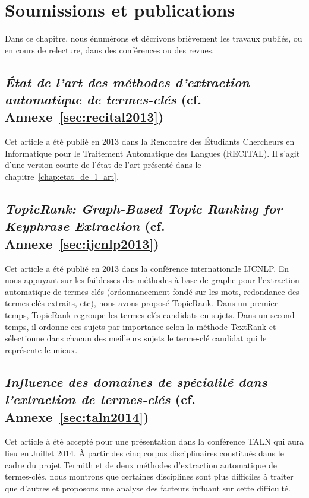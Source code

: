 \chapter{Soumissions et publications}
  Dans ce chapitre, nous énumérons et décrivons brièvement les travaux
  publiés, ou en cours de relecture, dans des conférences ou des revues.

  \section{\textit{État de l'art des méthodes d'extraction automatique de
           termes-clés} (cf. Annexe~\ref{sec:recital2013})}
    Cet article a été publié en 2013 dans la Rencontre des Étudiants Chercheurs
    en Informatique pour le Traitement Automatique des Langues (RECITAL). Il
    s'agit d'une version courte de l'état de l'art présenté dans le
    chapitre~\ref{chap:etat_de_l_art}.

  \section{\textit{TopicRank: Graph-Based Topic Ranking for Keyphrase
           Extraction} (cf. Annexe~\ref{sec:ijcnlp2013})}
  \label{sec:resume_ijcnlp2013}
    Cet article a été publié en 2013 dans la conférence internationale IJCNLP.
    En nous appuyant sur les faiblesses des méthodes à base de graphe pour
    l'extraction automatique de termes-clés (ordonnancement fondé sur les mots,
    redondance des termes-clés extraits, etc), nous avons proposé TopicRank.
    Dans un premier temps, TopicRank regroupe les termes-clés candidats en
    sujets. Dans un second temps, il ordonne ces sujets par importance selon la
    méthode TextRank et sélectionne dans chacun des meilleurs sujets le
    terme-clé candidat qui le représente le mieux.

  \section{\textit{Influence des domaines de spécialité dans l'extraction de
           termes-clés} (cf. Annexe~\ref{sec:taln2014})}
    Cet article à été accepté pour une présentation dans la conférence TALN qui
    aura lieu en Juillet 2014. À partir des cinq corpus disciplinaires
    constitués dans le cadre du projet Termith et de deux méthodes d'extraction
    automatique de termes-clés, nous montrons que certaines disciplines sont
    plus difficiles à traiter que d'autres et proposons une analyse des facteurs
    influant sur cette difficulté.

